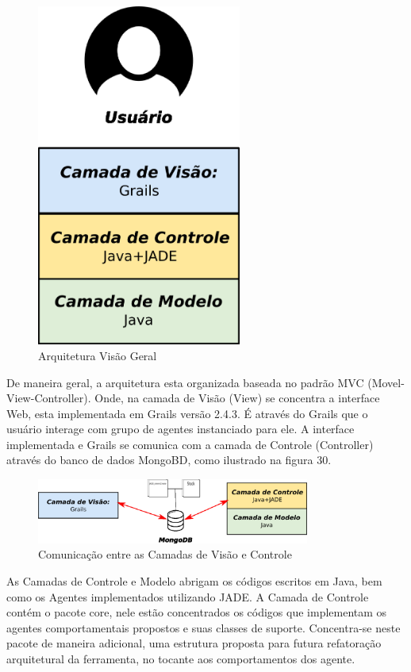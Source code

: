 \begin{figure}[h]
\centering
\label{f29}
\includegraphics[width=0.6\textwidth]{figuras/arquiteturaVisaoGeral}
\caption{Arquitetura Visão Geral}
\end{figure}

De maneira geral, a arquitetura esta organizada baseada no padrão MVC (Movel-View-Controller). Onde, na camada de Visão (View) se concentra a interface Web, esta implementada em Grails versão 2.4.3. É através do Grails que o usuário interage com grupo de agentes instanciado para ele. A interface implementada e Grails se comunica com a camada de Controle (Controller) através do banco de dados MongoBD, como ilustrado na figura 30.  

\begin{figure}[h]
\centering
\label{f30}
\includegraphics[width=0.8\textwidth]{figuras/comunicacao2}
\caption{Comunicação entre as Camadas de Visão e Controle}
\end{figure}

As Camadas de Controle e Modelo abrigam os códigos escritos em Java, bem como os Agentes implementados utilizando JADE. A Camada de Controle contém o pacote core, nele estão concentrados os códigos que implementam os agentes comportamentais propostos e suas classes de suporte. Concentra-se neste pacote de maneira adicional, uma estrutura proposta para futura refatoração arquitetural da ferramenta, no tocante aos comportamentos dos agente.

